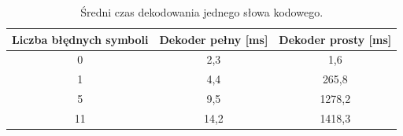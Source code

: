\begin{table}[h]
\centering
\begin{tabular}{ccc}
\toprule
Liczba błędnych symboli & Dekoder pełny [ms] & Dekoder prosty [ms] \\
\midrule
0 & 2,3 & 1,6 \\
1 & 4,4 & 265,8 \\
5 & 9,5 & 1278,2 \\
11 & 14,2 & 1418,3 \\
\bottomrule
\end{tabular}
\caption{Średni czas dekodowania jednego słowa kodowego.}
\label{tab:timing}
\end{table}
